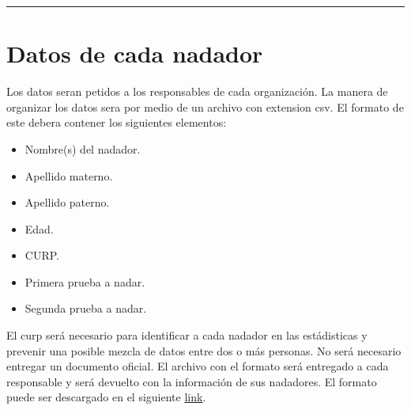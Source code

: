 \hrule
\section{Datos de cada nadador}
Los datos seran petidos a los responsables de cada organización. La manera de organizar los datos sera por medio de un archivo con extension csv. El formato de este debera contener los siguientes elementos:
\begin{itemize}
    \item Nombre(s) del nadador.
    \item Apellido materno.
    \item Apellido paterno.
    \item Edad.
    \item CURP.
    \item Primera prueba a nadar.
    \item Segunda prueba a nadar.
\end{itemize}
El curp será necesario para identificar a cada nadador en las estádisticas y prevenir una posible mezcla de datos entre dos o más personas. No será necesario entregar un documento oficial. El archivo con el formato será entregado a cada responsable y será devuelto con la información de sus nadadores. El formato puede ser descargado en el siguiente \href{https://github.com/giovannilopez9808/Competencia_2021/raw/main/Formats/data.zip}{link}.
